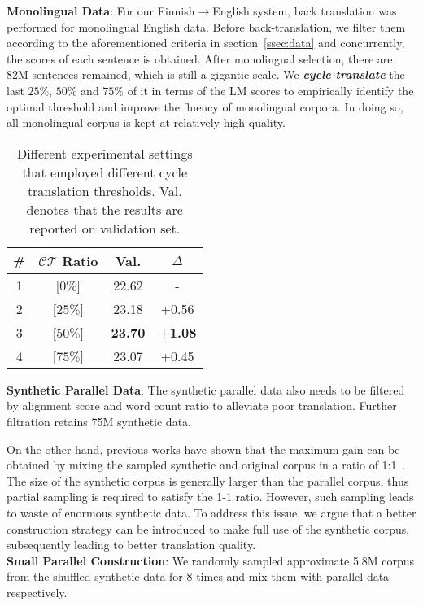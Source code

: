 \documentclass[11pt,a4paper]{article}
\begin{document}
\textbf{Monolingual Data}:
For our Finnish$\rightarrow$English system, back translation was performed for monolingual English data. Before back-translation, we filter them according to the aforementioned criteria in section~\ref{ssec:data} and concurrently, the scores of each sentence is obtained. After monolingual selection, there are 82M sentences remained, which is still a gigantic scale. We \textbf{\textit{cycle translate}} the last $25\%$, $50\%$ and $75\%$ of it in terms of the LM scores to empirically identify the optimal threshold and improve the fluency of monolingual corpora. In doing so, all monolingual corpus is kept at relatively high quality.\\


\begin{table}[t]
\centering
    \begin{tabular}{c|c||cc}
    \textbf{\#} &  \textbf{ $\mathcal{C}\mathcal{T}$ Ratio} & \textbf{Val.} & $\Delta$\\
    \hline\hline
    1&[$0\%$]&22.62&-\\
    2&[$25\%$]&23.18&+0.56\\
    3&[$50\%$]&\textbf{23.70}&\textbf{+1.08}\\
    4&[$75\%$]&23.07&+0.45\\
    \end{tabular}
    \caption{Different experimental settings that employed different cycle translation thresholds. Val. denotes that the results are reported on validation set.}
    \label{tab:thresholds}
\end{table}

\textbf{Synthetic Parallel Data}:
The synthetic parallel data also needs to be filtered by alignment score and word count ratio to alleviate poor translation. Further filtration retains 75M synthetic data. 

On the other hand, previous works have shown that the maximum gain can be obtained by mixing the sampled synthetic and original corpus in a ratio of 1:1~\cite{sennrich2015improving,sennrich-etal-2016-edinburgh}. The size of the synthetic corpus is generally larger than the parallel corpus, thus partial sampling is required to satisfy the 1-1 ratio. However, such sampling leads to waste of enormous synthetic data. To address this issue, we argue that a better construction strategy can be introduced to make full use of the synthetic corpus, subsequently leading to better translation quality.\\

\textbf{Small Parallel Construction}:
We randomly sampled approximate 5.8M corpus from the shuffled synthetic data for 8 times and mix them with parallel data respectively. \\
\end{document}
